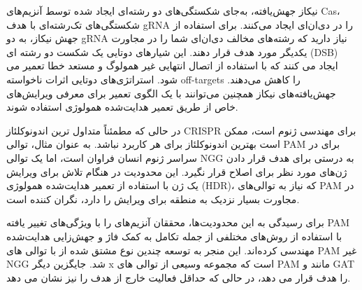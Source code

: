 \documentclass[12pt,a4paper,BCOR=.7cm,headsepline,bibliography=totoc]{report}
\begin{document}
نیکاز  جهش‌یافته‌، به‌جای شکستگی‌های دو رشته‌ای ایجاد شده توسط آنزیم‌های Cas، شکستگی‌های تک‌رشته‌ای با هدف gRNA را در دی‌ان‌ای ایجاد می‌کنند. برای استفاده از جهش نیکاز، به دو gRNA نیاز دارید که رشته‌های مخالف دی‌ان‌ای شما را در مجاورت یکدیگر مورد هدف قرار دهند. این شیارهای دوتایی یک شکست دو رشته ای (DSB) ایجاد می کنند که با استفاده از اتصال انتهایی غیر همولوگ  و مستعد خطا تعمیر می شود. استراتژی‌های دوتایی اثرات ناخواسته off-targets را کاهش می‌دهند. جهش‌یافته‌های نیکاز همچنین می‌توانند با یک الگوی تعمیر برای معرفی ویرایش‌های خاص از طریق تعمیر هدایت‌شده همولوژی  استفاده شوند.

در حالی که   مطمئناً متداول ترین اندونوکلئاز CRISPR برای مهندسی ژنوم است، ممکن است بهترین اندونوکلئاز برای هر کاربرد نباشد. به عنوان مثال، توالی PAM برای
 در سراسر ژنوم انسان فراوان است، اما یک توالی NGG به درستی برای هدف قرار دادن ژن‌های مورد نظر برای اصلاح قرار نگیرد. این محدودیت در هنگام تلاش برای ویرایش یک ژن با استفاده از تعمیر هدایت‌شده همولوژی (HDR)، که نیاز به توالی‌های PAM در مجاورت بسیار نزدیک به منطقه برای ویرایش را دارد، نگران کننده است.

برای رسیدگی به این محدودیت‌ها، محققان آنزیم‌های  را با ویژگی‌های تغییر یافته PAM با استفاده از روش‌های مختلفی از جمله تکامل به کمک فاژ و جهش‌زایی هدایت‌شده مهندسی کرده‌اند. این منجر به توسعه چندین نوع مشتق شده از  با توالی های PAM غیر NGG شد. جایگزین دیگر   x است که مجموعه وسیعی از توالی های PAM مانند  و GAT را هدف قرار می دهد، در حالی که حداقل فعالیت خارج از هدف را نیز نشان می دهد.
\end{document}
